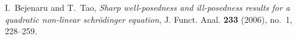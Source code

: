 \documentclass[12pt,reqno]{amsart}
\numberwithin{equation}{section}  %
\begin{document}
\providecommand{\MR}{\relax\ifhmode\unskip\space\fi MR }
\providecommand{\MRhref}[2]{%
  \href{http://www.ams.org/mathscinet-getitem?mr=#1}{#2}
}
\providecommand{\href}[2]{#2}
\begin{thebibliography}{BT06}

I.~Bejenaru and T.~Tao, \emph{Sharp well-posedness and ill-posedness results
  for a quadratic non-linear schr{\"o}dinger equation}, J. Funct. Anal.
  \textbf{233} (2006), no.~1, 228--259.

\end{thebibliography}
%
%
%
\end{document}
